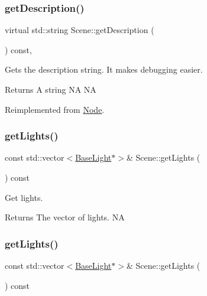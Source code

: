 \subsubsection{\texorpdfstring{get\+Description()}{getDescription()}\hspace{0.1cm}{\footnotesize\ttfamily [2/2]}}
{\footnotesize\ttfamily virtual std\+::string Scene\+::get\+Description (\begin{DoxyParamCaption}{ }\end{DoxyParamCaption}) const\hspace{0.3cm}{\ttfamily [override]}, {\ttfamily [virtual]}}

Gets the description string. It makes debugging easier. \begin{DoxyReturn}{Returns}
A string  NA  NA 
\end{DoxyReturn}


Reimplemented from \hyperlink{classNode_a41710375a0d92a4ee54c39fe123b5912}{Node}.

\mbox{\label{classScene_abf8fbf57b95e05400254effb2f057125}} 
\subsubsection{\texorpdfstring{get\+Lights()}{getLights()}\hspace{0.1cm}{\footnotesize\ttfamily [1/2]}}
{\footnotesize\ttfamily const std\+::vector$<$\hyperlink{classBaseLight}{Base\+Light}$\ast$$>$\& Scene\+::get\+Lights (\begin{DoxyParamCaption}{ }\end{DoxyParamCaption}) const\hspace{0.3cm}{\ttfamily [inline]}}

Get lights. \begin{DoxyReturn}{Returns}
The vector of lights.  NA 
\end{DoxyReturn}
\mbox{\label{classScene_abf8fbf57b95e05400254effb2f057125}} 
\subsubsection{\texorpdfstring{get\+Lights()}{getLights()}\hspace{0.1cm}{\footnotesize\ttfamily [2/2]}}
{\footnotesize\ttfamily const std\+::vector$<$\hyperlink{classBaseLight}{Base\+Light}$\ast$$>$\& Scene\+::get\+Lights (\begin{DoxyParamCaption}{ }\end{DoxyParamCaption}) const\hspace{0.3cm}{\ttfamily [inline]}}

